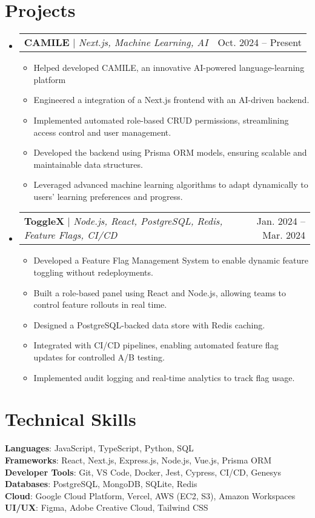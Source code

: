 \documentclass[letterpaper,11pt]{article}
\makeatletter
\newcommand{\resumeItem}[1]{
  \item\small{
    {#1 \vspace{-2pt}}
  }
}
\newcommand{\resumeProjectHeading}[2]{
    \item
    \begin{tabular*}{0.97\textwidth}{l@{\extracolsep{\fill}}r}
      \small#1 & #2 \\
    \end{tabular*}\vspace{-7pt}
}
\newcommand{\resumeItemListStart}{\begin{itemize}}
\newcommand{\resumeItemListEnd}{\end{itemize}\vspace{-5pt}}
\makeatother
\begin{document}
\section{Projects}
  \begin{itemize}[leftmargin=0.15in, label={}]
\resumeProjectHeading
  {\textbf{CAMILE} $|$ \emph{Next.js, Machine Learning, AI}}{Oct. 2024 -- Present}
  \resumeItemListStart
    \resumeItem{Helped developed CAMILE, an innovative AI-powered language-learning platform}
    \resumeItem{Engineered a integration of a Next.js frontend with an AI-driven backend.}
    \resumeItem{Implemented automated role-based CRUD permissions, streamlining access control and user management.}
    \resumeItem{Developed the backend using Prisma ORM models, ensuring scalable and maintainable data structures.}
    \resumeItem{Leveraged advanced machine learning algorithms to adapt dynamically to users’ learning preferences and progress.}
  \resumeItemListEnd

   \resumeProjectHeading
  {\textbf{ToggleX} $|$ \emph{Node.js, React, PostgreSQL, Redis, Feature Flags, CI/CD}}{Jan. 2024 -- Mar. 2024}
  \resumeItemListStart
    \resumeItem{Developed a Feature Flag Management System to enable dynamic feature toggling without redeployments.}
    \resumeItem{Built a role-based panel using React and Node.js, allowing teams to control feature rollouts in real time.}
    \resumeItem{Designed a PostgreSQL-backed data store with Redis caching.}
    \resumeItem{Integrated with CI/CD pipelines, enabling automated feature flag updates for controlled A/B testing.}
    \resumeItem{Implemented audit logging and real-time analytics to track flag usage.}
  \resumeItemListEnd
  \end{itemize}

\section{Technical Skills}
 \begin{itemize}[leftmargin=0.15in, label={}]
    \small{\item{
     \textbf{Languages}{: JavaScript, TypeScript, Python, SQL} \\
     \textbf{Frameworks}{: React, Next.js, Express.js, Node.js, Vue.js, Prisma ORM} \\
     \textbf{Developer Tools}{: Git, VS Code, Docker, Jest, Cypress, CI/CD, Genesys} \\
     \textbf{Databases}{: PostgreSQL, MongoDB, SQLite, Redis} \\
     \textbf{Cloud}{: Google Cloud Platform, Vercel, AWS (EC2, S3), Amazon Workspaces} \\
     \textbf{UI/UX}{: Figma, Adobe Creative Cloud, Tailwind CSS} \\
    }}
 \end{itemize}


\end{document}
